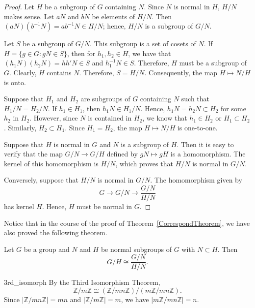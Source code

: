  
\begin{proof}
Let $H$ be a subgroup of $G$ containing $N$. Since $N$ is normal in
$H$, $H/N$ makes sense.  Let $aN$ and $bN$ be elements of $H/N$. Then
$(aN)( b^{-1} N )= ab^{-1}N \in H/N$; hence, $H/N$ is a subgroup of
$G/N$. 


Let $S$ be a subgroup of $G/N$. This subgroup is a set of cosets of
$N$.  If  $H= \{ g \in G : gN \in S \}$, then for $h_1, h_2 \in H$, we
have that $(h_1 N)( h_2 N )= h h' N \in S$ and $h_1^{-1} N \in S$.
Therefore, $H$ must be a subgroup of $G$. Clearly, $H$ contains $N$.
Therefore, $S = H / N$. Consequently, the map  $H \mapsto N/H$ is
onto. 

 
Suppose that $H_1$ and $H_2$ are subgroups of $G$ containing $N$ such
that $H_1/N = H_2/N$. If $h_1 \in H_1$, then $h_1 N \in H_1/N$. Hence,
$h_1 N = h_2 N \subset H_2$ for some $h_2$ in $H_2$. However, since
$N$ is contained in $H_2$, we know that $h_1 \in H_2$ or $H_1 \subset
H_2$. Similarly, $H_2 \subset H_1$.  Since $H_1 = H_2$, the map  $H
\mapsto N/H$ is one-to-one. 


 
Suppose that $H$ is normal in $G$ and $N$ is a subgroup of $H$.  Then
it is easy to verify that the map $G/N \rightarrow G/H$ defined by $gN
\mapsto gH$ is  a homomorphism.  The kernel of this homomorphism is
$H/N$, which proves that $H/N$ is normal in $G/N$. 
 
 
Conversely, suppose that $H/N$ is normal in $G/N$. The homomorphism
given by 
\[
G \rightarrow G/N \rightarrow \frac{G/N}{H/N}
\]
has kernel $H$. Hence, $H$ must be normal in $G$.
\end{proof}
 
\medskip
 
 
Notice that in the course of the proof of Theorem~\ref{CorrespondTheorem}, we have also
proved the following theorem. 
 
 
\begin{theorem}\label{ThirdIsoTheorem}
Let $G$ be a group and $N$ and $H$ be normal subgroups of $G$ with $N
\subset H$.  Then 
\[
G/H \cong \frac{G/N}{H/N}.
\]
\end{theorem}
 
 
\begin{example}{3rd_isomorph}
By the Third Isomorphism Theorem,
\[
{\mathbb Z} / m {\mathbb Z} \cong ({\mathbb Z}/ mn {\mathbb Z})/ (m {\mathbb Z}/ mn
{\mathbb Z}). 
\]
Since $| {\mathbb Z} / mn {\mathbb Z} | = mn$ and  $|{\mathbb Z} / m{\mathbb Z}| =
m$, we have $| m {\mathbb Z} / mn {\mathbb Z}| = n$. 
\end{example}
 
